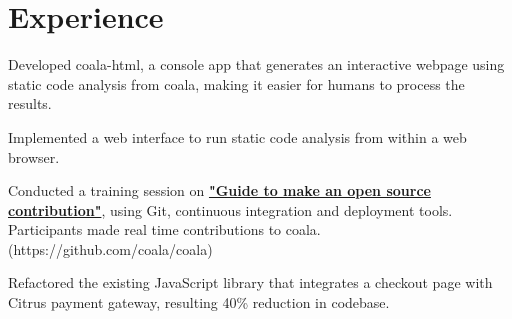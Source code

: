 \documentclass[]{deedy-resume-openfont}
\begin{document}
\begin{minipage}[t]{0.66\textwidth}


\section{Experience}

\vspace{\topsep}
\begin{tightemize}
\item Developed coala-html, a console app that generates an interactive webpage using static code analysis from coala, making it easier for humans to process the results. \textbf{\href{https://github.com/coala/coala-html}{ }} \end{tightemize}
\begin{tightemize}
\item Implemented a web interface to run static code analysis from within a web browser.\end{tightemize}
\sectionsep

\vspace{\topsep}
\begin{tightemize}
\item Conducted a training session on \textbf{\href{https://ep2016.europython.eu/conference/talks/guid-to-make-a-real-contribution-to-an-open-source-project-for-novice}{"Guide to make an open source contribution"}}, using Git, continuous integration and deployment tools. Participants made real time contributions to coala. (https://github.com/coala/coala)
\end{tightemize}
\sectionsep

\vspace{\topsep}
\begin{tightemize}
\item Refactored the existing JavaScript library that integrates a checkout page with Citrus payment gateway, resulting 40\% reduction in codebase. \end{tightemize}
\sectionsep




\end{minipage}
\end{document}

